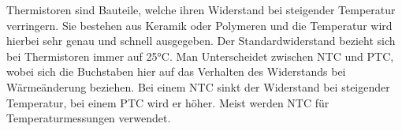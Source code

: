 Thermistoren sind Bauteile, welche ihren Widerstand bei steigender Temperatur
verringern. Sie bestehen aus Keramik oder Polymeren und die Temperatur wird
hierbei sehr genau und schnell ausgegeben. Der Standardwiderstand bezieht sich
bei Thermistoren immer auf 25°C. Man Unterscheidet zwischen NTC und PTC, wobei
sich die Buchstaben hier auf das Verhalten des Widerstands bei Wärmeänderung
beziehen. Bei einem NTC sinkt der Widerstand bei steigender Temperatur, bei
einem PTC wird er höher. Meist werden NTC für Temperaturmessungen verwendet.\cite{hering2018temperaturmesstechnik}